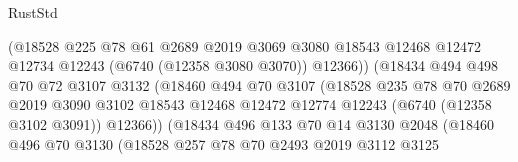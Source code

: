 \begin{lexlean}{RustStd}
\begin{coremodule}
                                  (@18528
                                    @225
                                    @78
                                    @61
                                    @2689
                                    @2019
                                    @3069
                                    @3080
                                    @18543
                                    @12468
                                    @12472
                                    @12734
                                    @12243
                                    (@6740 (@12358 @3080 @3070))
                                    @12366))
                                (@18434
                                  @494
                                  @498
                                  @70
                                  @72
                                  @3107
                                  @3132
                                  (@18460
                                    @494
                                    @70
                                    @3107
                                    (@18528
                                      @235
                                      @78
                                      @70
                                      @2689
                                      @2019
                                      @3090
                                      @3102
                                      @18543
                                      @12468
                                      @12472
                                      @12774
                                      @12243
                                      (@6740 (@12358 @3102 @3091))
                                      @12366))
                                  (@18434
                                    @496
                                    @133
                                    @70
                                    @14
                                    @3130
                                    @2048
                                    (@18460
                                      @496
                                      @70
                                      @3130
                                      (@18528
                                        @257
                                        @78
                                        @70
                                        @2493
                                        @2019
                                        @3112
                                        @3125

\end{coremodule}
\end{lexlean}
